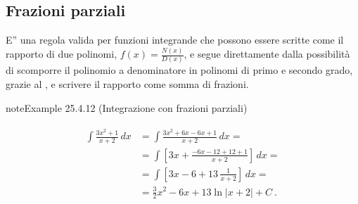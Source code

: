 \documentclass[letterpaper,10pt,italian]{jupyterBook}
\begin{document}
\subsection{Frazioni parziali}
\label{\detokenize{ch/infinitesimal_calculus/integrals:frazioni-parziali}}
\sphinxAtStartPar
{} E” una regola valida per funzioni integrande che possono essere scritte come il rapporto di due polinomi, \(f(x) = \frac{N(x)}{D(x)}\), e segue direttamente dalla possibilità di scomporre il polinomio a denominatore in polinomi di primo e secondo grado, grazie al {\hyperref[\detokenize{ch/precalculus/polynomials:math-hs-precalculus-polynomials-alg-fund-thm}]{}}, e scrivere il rapporto come somma di frazioni.

\sphinxAtStartPar
{} 
\label{ch/infinitesimal_calculus/integrals:example-17}
\begin{sphinxadmonition}{note}{Example 25.4.12 (Integrazione con frazioni parziali)}


\begin{equation*}
\begin{split}\begin{aligned}
  \int \frac{3 x^2 + 1}{ x + 2} \, dx
  & = \int \frac{3 x^2 + 6x - 6x + 1}{x+2} \,dx = \\
  & = \int \left[ 3 x + \frac{-6 x - 12 + 12 +1 }{x + 2} \right] \, dx = \\
  & = \int \left[ 3 x - 6 + 13 \, \frac{1}{x + 2} \right] \, dx = \\
  & = \frac{3}{2} x^2 - 6 x + 13 \ln |x+2| + C \ .
\end{aligned}\end{split}
\end{equation*}\end{sphinxadmonition}
\label{ch/infinitesimal_calculus/integrals:example-18}
\end{document}
